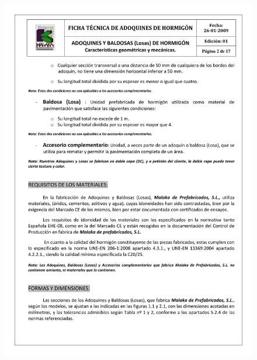 \begin{figure}[!htb]
\centering
\includegraphics[scale=0.68]{ficha_tecnica/ft_adoquin_2.pdf}
\label{fig:ftadoquin2}
\end{figure}
\newpage
